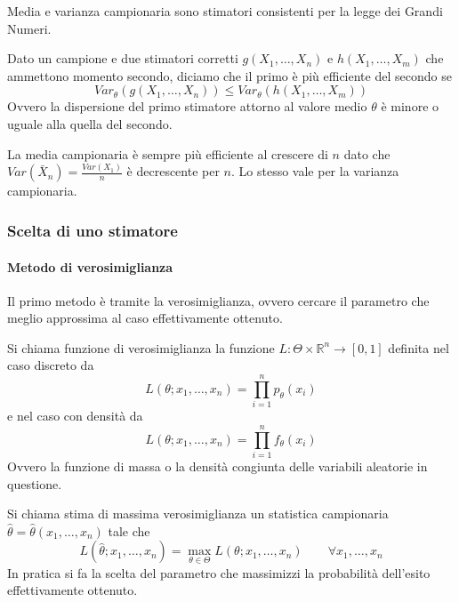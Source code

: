 \begin{observation}
	Media e varianza campionaria sono stimatori consistenti per la legge dei Grandi Numeri.
\end{observation}

\begin{definition}
	Dato un campione e due stimatori corretti $g(X_1, \ldots, X_n)$ e $h(X_1, \ldots, X_m)$ che ammettono momento secondo, diciamo che il primo è più efficiente del secondo se
	\begin{equation}
		Var_\theta(g(X_1, \ldots, X_n)) \leq Var_\theta(h(X_1, \ldots, X_m))
	\end{equation}
	Ovvero la dispersione del primo stimatore attorno al valore medio $\theta$ è minore o uguale alla quella del secondo.
\end{definition}

\begin{observation}
	La media campionaria è sempre più efficiente al crescere di $n$ dato che $Var(\bar{X}_n)=\frac{Var(X_1)}{n}$ è decrescente per $n$. Lo stesso vale per la varianza campionaria.
\end{observation}

\subsubsection{Scelta di uno stimatore}
\paragraph{Metodo di verosimiglianza}
Il primo metodo è tramite la verosimiglianza, ovvero cercare il parametro che meglio approssima al caso effettivamente ottenuto.
\begin{definition}
	Si chiama funzione di verosimiglianza la funzione $L:\Theta \times \mathbb{R}^n \to [0,1]$ definita nel caso discreto da
	\begin{equation}
		L(\theta;x_1, \ldots, x_n) = \prod_{i=1}^{n}p_\theta(x_i)
	\end{equation}
	e nel caso con densità da
	\begin{equation}
		L(\theta; x_1, \ldots, x_n) = \prod_{i=1}^{n} f_\theta(x_i)
	\end{equation}
	Ovvero la funzione di massa o la densità congiunta delle variabili aleatorie in questione.
\end{definition}

\begin{definition}
	Si chiama stima di massima verosimiglianza un statistica campionaria $\hat{\theta}=\hat{\theta}(x_1, \ldots, x_n)$ tale che
	\begin{equation}
		L(\hat{\theta}; x_1, \ldots, x_n) = \max_{\theta \in \Theta}L(\theta; x_1, \ldots, x_n) \quad\quad \forall x_1, \ldots, x_n
	\end{equation}
	In pratica si fa la scelta del parametro che massimizzi la probabilità dell'esito effettivamente ottenuto.
\end{definition}

